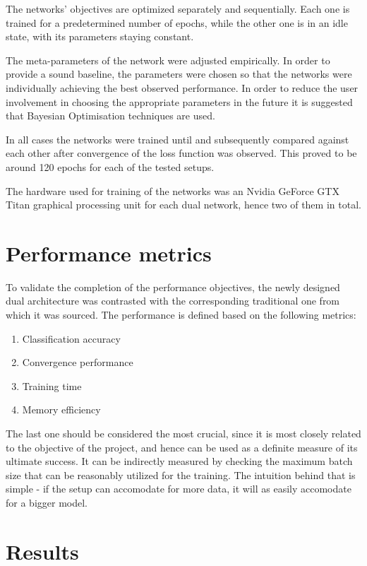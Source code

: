 \documentclass[letterpaper]{article}
\begin{document}
The networks' objectives are optimized separately and sequentially. Each one is trained for a predetermined number of epochs, while the other one is in an idle state, with its parameters staying constant.

The meta-parameters of the network were adjusted empirically. In order to provide a sound baseline, the parameters were chosen so that the networks were individually achieving the best observed performance. In order to reduce the user involvement in choosing the appropriate parameters in the future it is suggested that Bayesian Optimisation techniques are used.

In all cases the networks were trained until and subsequently compared against each other after convergence of the loss function was observed. This proved to be around 120 epochs for each of the tested setups.

The hardware used for training of the networks was an Nvidia GeForce GTX Titan graphical processing unit for each dual network, hence two of them in total.

\section{Performance metrics}

To validate the completion of the performance objectives, the newly designed dual architecture was contrasted with the corresponding traditional one from which it was sourced. The performance is defined based on the following metrics:
\begin{enumerate}
	\item Classification accuracy
	\item Convergence performance
	\item Training time
	\item Memory efficiency
\end{enumerate}

The last one should be considered the most crucial, since it is most closely related to the objective of the project, and hence can be used as a definite measure of its ultimate success. It can be indirectly measured by checking the maximum batch size that can be reasonably utilized for the training. The intuition behind that is simple - if the setup can accomodate for more data, it will as easily accomodate for a bigger model. 

\section{Results}
\end{document}

